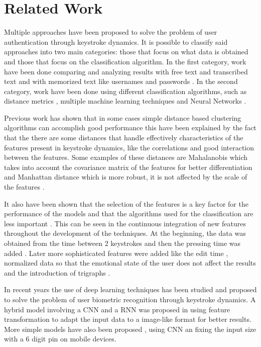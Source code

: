 \section{Related Work}

Multiple approaches have been proposed to solve the problem of user authentication through keystroke dynamics. It is possible to classify said approaches into two main categories: those that focus on what data is obtained and those that focus on the classification algorithm. In the first category, work have been done comparing and analyzing results with free text and transcribed text \cite{old,programmers} and with memorized text like usernames and passwords \cite{bleha1990login, pnn}. In the second category, work have been done using different classification algorithms, such as distance metrics \cite{combine_distance}, multiple machine learning techniques \cite{machine_learning} and Neural Networks \cite{deep_learning, maiorana2019deepkey}.

Previous work has shown that in some cases simple distance based clustering algorithms can accomplish good performance \cite{robinson1998login, bergadano2002norm_distance,de2000mahalanobis,programmers} this have been explained by the fact that the there are some distances that handle effectively characteristics of the features present in keystroke dynamics, like the correlations  and good interaction between the features. Some examples of these distances are Mahalanobis which takes into account the covariance matrix of the features for better differentiation and  Manhattan distance which is more robust, it is not affected by the scale of the features \cite{combine_distance}. 

It also have been shown that the selection of the features is a key factor for the performance of the models and that the algorithms used for the classification are less important \cite{pnn}. This can be seen in the continuous integration of new features throughout the development of the techniques. At the beginning, the data was obtained from the time between 2 keystrokes  \cite{bleha1990login} and then the pressing time was added \cite{robinson1998login}. Later more sophisticated features were added like the edit time \cite{machine_learning}, normalized data so that the emotional state of the user does not affect the results  and the introduction of trigraphs \cite{bergadano2002norm_distance}.

In recent years the use of deep learning techniques has been studied and proposed to solve the problem of user biometric recognition through keystroke dynamics. A hybrid model involving a CNN and a RNN was proposed in \cite{deep_learning} using feature transformation to adapt the input data to a image-like format for better results. More simple models have also been proposed \cite{maiorana2019deepkey}, using CNN an fixing the input size with a 6 digit pin on mobile devices.